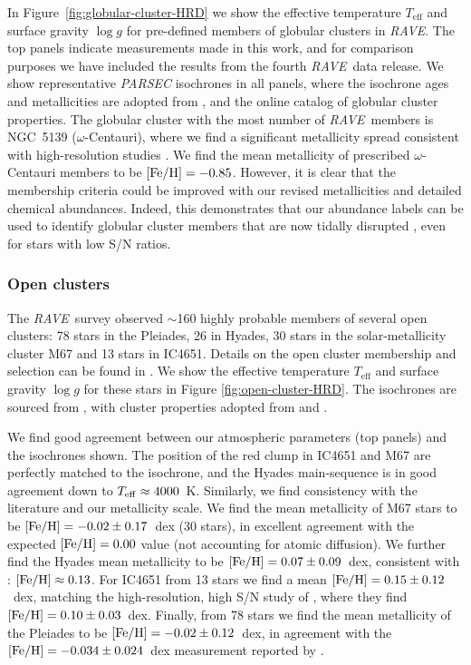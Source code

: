 \documentclass[preprint,trackchanges]{aastex}
\newcommand{\acronym}[1]{{\small{#1}}}
\newcommand{\project}[1]{\textsl{#1}}
\newcommand{\rave}{\project{\acronym{RAVE}}}
\newcommand{\teff}{T_{\mathrm{eff}}}
\newcommand{\logg}{\log g}
\begin{document}
In Figure~\ref{fig:globular-cluster-HRD} we show the effective temperature
$\teff$ and surface gravity $\logg$ for pre-defined members of globular clusters in \rave.
The top panels indicate measurements made in this work, and for comparison purposes we have included
the results from the fourth \rave\ data release.  We show representative \project{PARSEC} isochrones 
\citep{Bressan_2012} in all panels, where the isochrone ages and metallicities are adopted from
\citet{Kunder_2016,Marin-Franch_2009}, and the \citet[][accessed 6 September 2016]{Harris_1996} 
online catalog of globular cluster properties.  The globular cluster with the most number of
\rave\ members is NGC~5139 ($\omega$-Centauri), where we find a significant metallicity spread
consistent with high-resolution studies \citep{Marino_2011,Carretta_2009,Carretta_2013}.  We
find the mean metallicity of prescribed $\omega$-Centauri members to be $[{\rm Fe/H}] = -0.85$.
However, it is clear that the membership criteria could be improved with our
revised metallicities and detailed chemical abundances. 
Indeed, this demonstrates that our abundance labels can be used to identify
globular cluster members that are now tidally disrupted \citep{Anguiano_2016,Kuzma_2016,Navin_2016},
even for stars with low S/N ratios.


\subsubsection{Open clusters}
\label{sec:open-cluster-validation}

The \rave\ survey observed $\sim$160 highly probable members of several open clusters:
78 stars in the Pleiades, 26 in Hyades, 30 stars in the solar-metallicity cluster
M67 and 13 stars in IC4651. Details on the open cluster membership and selection can 
be found in \cite{Kunder_2016}.  We show the effective temperature $\teff$ and surface
gravity $\logg$ for these stars in Figure \ref{fig:open-cluster-HRD}.  The isochrones
are sourced from \citet{Bressan_2012}, with cluster properties adopted from 
\cite{Kunder_2016} and \cite{Kharchenko_2013}.  


We find good agreement between our atmospheric parameters (top panels) and the 
isochrones shown.  The position of the red clump in IC4651 and M67 are perfectly matched
to the isochrone, and the Hyades main-sequence is in good agreement down to 
$T_{\rm eff} \approx 4000$~K.  Similarly, we find consistency with the literature and
our metallicity scale.  We find the mean metallicity of M67 stars to be 
$[{\rm Fe/H}] = -0.02 \pm 0.17$~dex (30 stars), in excellent agreement with the
expected $[{\rm Fe/H}] = 0.00$ value (not accounting for atomic diffusion).
We further find the Hyades mean metallicity to be $[{\rm Fe/H}] = 0.07 \pm 0.09$~dex,
consistent with \citet{Paulson_2003}: $[{\rm Fe/H}] \approx 0.13$.
For IC4651 from 13 stars we find a mean $[{\rm Fe/H}] = 0.15 \pm 0.12$~dex, matching the
high-resolution, high S/N study of \citet{Pasquini_2004}, where they find 
$[{\rm Fe/H}] = 0.10 \pm 0.03$~dex. Finally, from 78 stars we find the mean
metallicity of the Pleiades to be $[{\rm Fe/H}] = -0.02 \pm 0.12$~dex, in agreement
with the $[{\rm Fe/H}] = -0.034 \pm 0.024$~dex measurement reported by 
\citet{Friel_Boesgaard_1990}.
\end{document}
